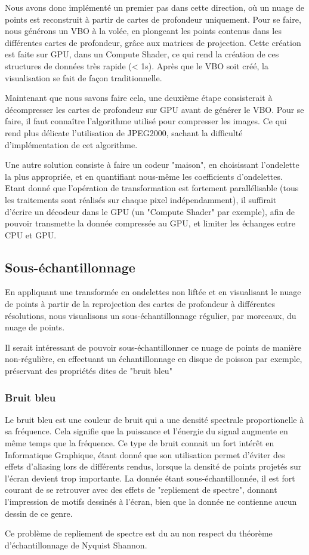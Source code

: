 \documentclass{report}
\begin{document}
Nous avons donc implémenté un premier pas dans cette direction, où un nuage de points est reconstruit à partir de cartes de profondeur uniquement.
Pour se faire, nous générons un VBO à la volée, en plongeant les points contenus dans les différentes cartes de profondeur, grâce aux matrices de projection.
Cette création est faite sur GPU, dans un Compute Shader, ce qui rend la création de ces structures de données très rapide (< 1s).
Après que le VBO soit créé, la visualisation se fait de façon traditionnelle.

Maintenant que nous savons faire cela, une deuxième étape consisterait à décompresser les cartes de profondeur sur GPU avant de générer le VBO.
Pour se faire, il faut connaître l'algorithme utilisé pour compresser les images. Ce qui rend plus délicate l'utilisation de JPEG2000, sachant la difficulté d'implémentation de cet algorithme.

Une autre solution consiste à faire un codeur "maison", en choisissant l'ondelette la plus appropriée, et en quantifiant nous-même les coefficients d'ondelettes.
Etant donné que l'opération de transformation est fortement parallélisable (tous les traitements sont réalisés sur chaque pixel indépendamment), il suffirait d'écrire un décodeur dans le GPU (un "Compute Shader" par exemple), afin de pouvoir transmette la donnée compressée au GPU, et limiter les échanges entre CPU et GPU.

\subsection{Sous-échantillonnage}
\label{subs:sous_echantillonnage}

En appliquant une transformée en ondelettes non liftée et en visualisant le nuage de points à partir de la reprojection des cartes de profondeur à différentes résolutions, nous visualisons un sous-échantillonnage régulier, par morceaux, du nuage de points.

Il serait intéressant de pouvoir sous-échantillonner ce nuage de points de manière non-régulière, en effectuant un échantillonnage en disque de poisson par exemple, préservant des propriétés dites de "bruit bleu"

\subsubsection{Bruit bleu}
\label{subs:Bruit_bleu}

Le bruit bleu est une couleur de bruit qui a une densité spectrale proportionelle à sa fréquence.
Cela signifie que la puissance et l'énergie du signal augmente en même temps que la fréquence.
Ce type de bruit connait un fort intérêt en Informatique Graphique, étant donné que son utilisation permet d'éviter des effets d'aliasing lors de différents rendus, lorsque la densité de points projetés sur l'écran devient trop importante.
La donnée étant sous-échantillonnée, il est fort courant de se retrouver avec des effets de "repliement de spectre", donnant l'impression de motifs dessinés à l'écran, bien que la donnée ne contienne aucun dessin de ce genre.

Ce problème de repliement de spectre est du au non respect du théorème d'échantillonnage de Nyquist Shannon.






\end{document}
